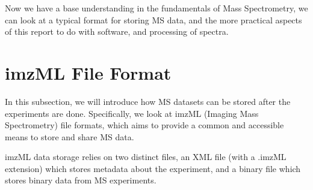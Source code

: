 \documentclass[11pt,openany]{book}
\begin{document}
Now we have a base understanding in the fundamentals of Mass Spectrometry, we can look at a typical format for storing MS data, and the more practical aspects of this report to do with software, and processing of spectra. 




\section{imzML File Format}
In this subsection, we will introduce how MS datasets can be stored after the experiments are done. Specifically, we look at imzML (Imaging Mass Spectrometry) file formats, which aims to provide a common and accessible means to store and share MS data.

imzML data storage relies on two distinct files, an XML file (with a .imzML extension) which stores metadata about the experiment, and a binary file which stores binary data from MS experiments. 
\end{document}

